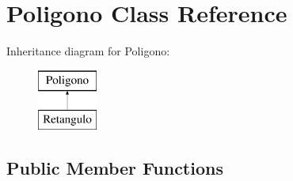 \hypertarget{class_poligono}{}\section{Poligono Class Reference}
\label{class_poligono}
Inheritance diagram for Poligono\+:\begin{figure}[H]
\begin{center}
\leavevmode
\includegraphics[height=2.000000cm]{class_poligono}
\end{center}
\end{figure}
\subsection*{Public Member Functions}
